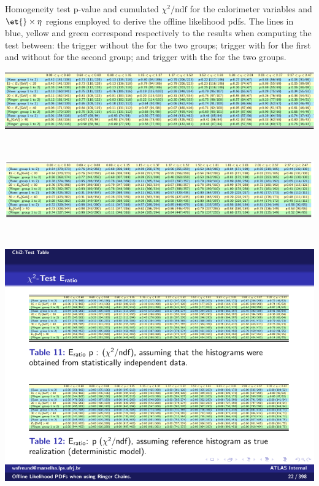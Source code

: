 \begin{table}[b]
\centering
\caption{\label{tab:p_values_homogeneity}Homogeneity test p-value and cumulated
  $\chi^2/\text{ndf}$ for the calorimeter variables and $\et{}\times\eta{}$
  regions employed to derive the offline likelihood pdfs. The lines in blue,
  yellow and green correspond respectively to the results when computing the
  test between: the trigger without the \rnn{} for the two groups; trigger with
  \rnn{} for the first and without for the second group; and trigger with the
  \rnn{} for the two groups. }
\begin{subtable}{\textwidth}
\caption{\reta{}\label{tab:p_values_reta}}
\includegraphics[width=\textwidth]{appendices/figures/homogeneity/reta_homogeneity_table.pdf}
\end{subtable} \\
\begin{subtable}{\textwidth}
\caption{\rphi{}\label{tab:p_values_rphi}}
\includegraphics[width=\textwidth]{appendices/figures/homogeneity/rphi_homogeneity_table.pdf}
\end{subtable} \\
\begin{subtable}{\textwidth}
\caption{\eratio{}\label{tab:p_values_eratio}}
\includegraphics[width=\textwidth]{appendices/figures/homogeneity/eratio_homogeneity_table.pdf}
\end{subtable} \\
\end{table}%
